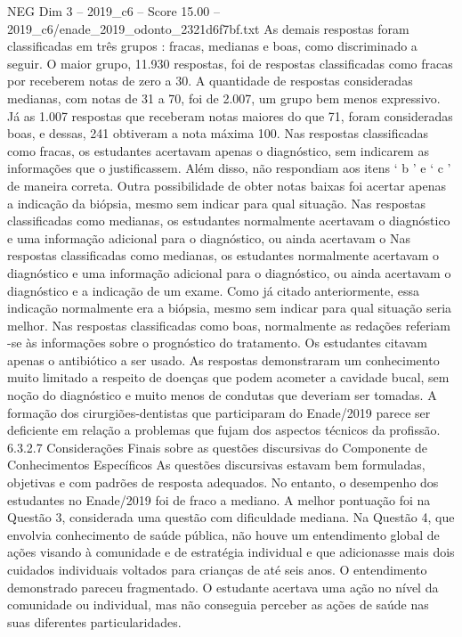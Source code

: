 \begin{textsample}{NEG Dim 3 – 2019\_c6 – Score 15.00 – 2019\_c6/enade\_2019\_odonto\_2321d6f7bf.txt}
As demais respostas foram classificadas em três grupos : fracas, medianas e boas, como discriminado a seguir.
O maior grupo, 11.930 respostas, foi de respostas classificadas como fracas por receberem notas de zero a 30.
A quantidade de respostas consideradas medianas, com notas de 31 a 70, foi de 2.007, um grupo bem menos expressivo.
Já as 1.007 respostas que receberam notas maiores do que 71, foram consideradas boas, e dessas, 241 obtiveram a nota máxima 100.
Nas respostas classificadas como fracas, os estudantes acertavam apenas o diagnóstico, sem indicarem as informações que o justificassem.
Além disso, não respondiam aos itens ‘ b ’ e ‘ c ’ de maneira correta.
Outra possibilidade de obter notas baixas foi acertar apenas a indicação da biópsia, mesmo sem indicar para qual situação.
Nas respostas classificadas como medianas, os estudantes normalmente acertavam o diagnóstico e uma informação adicional para o diagnóstico, ou ainda acertavam o Nas respostas classificadas como medianas, os estudantes normalmente acertavam o diagnóstico e uma informação adicional para o diagnóstico, ou ainda acertavam o diagnóstico e a indicação de um exame.
Como já citado anteriormente, essa indicação normalmente era a biópsia, mesmo sem indicar para qual situação seria melhor.
Nas respostas classificadas como boas, normalmente as redações referiam -se às informações sobre o prognóstico do tratamento.
Os estudantes citavam apenas o antibiótico a ser usado.
As respostas demonstraram um conhecimento muito limitado a respeito de doenças que podem acometer a cavidade bucal, sem noção do diagnóstico e muito menos de condutas que deveriam ser tomadas.
A formação dos cirurgiões-dentistas que participaram do Enade/2019 parece ser deficiente em relação a problemas que fujam dos aspectos técnicos da profissão. 6.3.2.7 Considerações Finais sobre as questões discursivas do Componente de Conhecimentos Específicos As questões discursivas estavam bem formuladas, objetivas e com padrões de resposta adequados.
No entanto, o desempenho dos estudantes no Enade/2019 foi de fraco a mediano.
A melhor pontuação foi na Questão 3, considerada uma questão com dificuldade mediana.
Na Questão 4, que envolvia conhecimento de saúde pública, não houve um entendimento global de ações visando à comunidade e de estratégia individual e que adicionasse mais dois cuidados individuais voltados para crianças de até seis anos.
O entendimento demonstrado pareceu fragmentado.
O estudante acertava uma ação no nível da comunidade ou individual, mas não conseguia perceber as ações de saúde nas suas diferentes particularidades.

\end{textsample}
